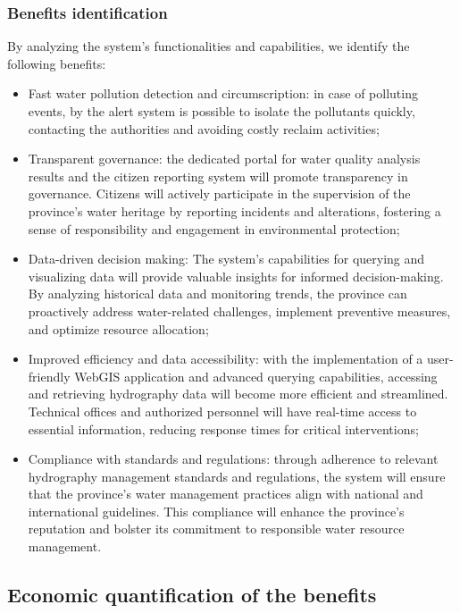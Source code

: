 \subsubsection{Benefits identification}
By analyzing the system's functionalities and capabilities, we identify the following benefits:
\begin{itemize}
    \item Fast water pollution detection and circumscription: in case of polluting events, by the alert system is possible to isolate the pollutants quickly, contacting the authorities and avoiding costly reclaim activities;
    \item Transparent governance: the dedicated portal for water quality analysis results and the citizen reporting system will promote transparency in governance. Citizens will actively participate in the supervision of the province's water heritage by reporting incidents and alterations, fostering a sense of responsibility and engagement in environmental protection;
    \item Data-driven decision making: The system's capabilities for querying and visualizing data will provide valuable insights for informed decision-making. By analyzing historical data and monitoring trends, the province can proactively address water-related challenges, implement preventive measures, and optimize resource allocation;
    \item Improved efficiency and data accessibility: with the implementation of a user-friendly WebGIS application and advanced querying capabilities, accessing and retrieving hydrography data will become more efficient and streamlined. Technical offices and authorized personnel will have real-time access to essential information, reducing response times for critical interventions;
    \item Compliance with standards and regulations: through adherence to relevant hydrography management standards and regulations, the system will ensure that the province's water management practices align with national and international guidelines. This compliance will enhance the province's reputation and bolster its commitment to responsible water resource management.
\end{itemize}

\subsection{Economic quantification of the benefits}
